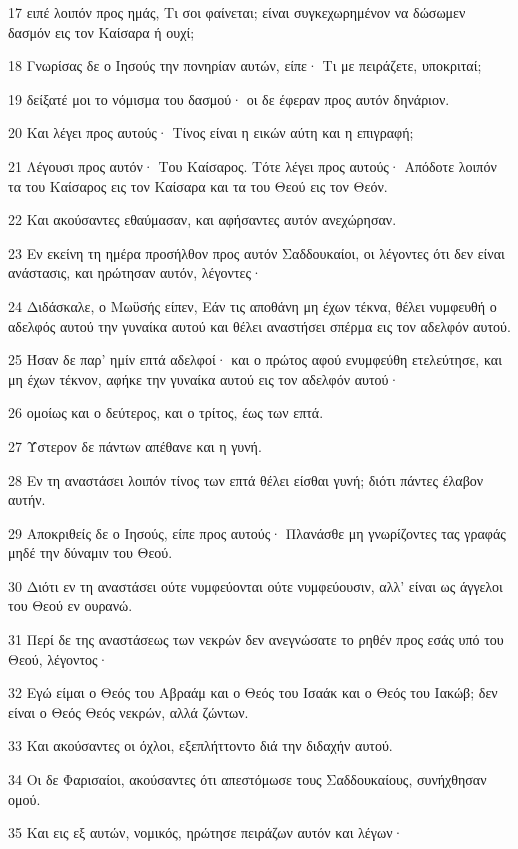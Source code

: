 \par 17 ειπέ λοιπόν προς ημάς, Τι σοι φαίνεται; είναι συγκεχωρημένον να δώσωμεν δασμόν εις τον Καίσαρα ή ουχί;
\par 18 Γνωρίσας δε ο Ιησούς την πονηρίαν αυτών, είπε· Τι με πειράζετε, υποκριταί;
\par 19 δείξατέ μοι το νόμισμα του δασμού· οι δε έφεραν προς αυτόν δηνάριον.
\par 20 Και λέγει προς αυτούς· Τίνος είναι η εικών αύτη και η επιγραφή;
\par 21 Λέγουσι προς αυτόν· Του Καίσαρος. Τότε λέγει προς αυτούς· Απόδοτε λοιπόν τα του Καίσαρος εις τον Καίσαρα και τα του Θεού εις τον Θεόν.
\par 22 Και ακούσαντες εθαύμασαν, και αφήσαντες αυτόν ανεχώρησαν.
\par 23 Εν εκείνη τη ημέρα προσήλθον προς αυτόν Σαδδουκαίοι, οι λέγοντες ότι δεν είναι ανάστασις, και ηρώτησαν αυτόν, λέγοντες·
\par 24 Διδάσκαλε, ο Μωϋσής είπεν, Εάν τις αποθάνη μη έχων τέκνα, θέλει νυμφευθή ο αδελφός αυτού την γυναίκα αυτού και θέλει αναστήσει σπέρμα εις τον αδελφόν αυτού.
\par 25 Ήσαν δε παρ' ημίν επτά αδελφοί· και ο πρώτος αφού ενυμφεύθη ετελεύτησε, και μη έχων τέκνον, αφήκε την γυναίκα αυτού εις τον αδελφόν αυτού·
\par 26 ομοίως και ο δεύτερος, και ο τρίτος, έως των επτά.
\par 27 Ύστερον δε πάντων απέθανε και η γυνή.
\par 28 Εν τη αναστάσει λοιπόν τίνος των επτά θέλει είσθαι γυνή; διότι πάντες έλαβον αυτήν.
\par 29 Αποκριθείς δε ο Ιησούς, είπε προς αυτούς· Πλανάσθε μη γνωρίζοντες τας γραφάς μηδέ την δύναμιν του Θεού.
\par 30 Διότι εν τη αναστάσει ούτε νυμφεύονται ούτε νυμφεύουσιν, αλλ' είναι ως άγγελοι του Θεού εν ουρανώ.
\par 31 Περί δε της αναστάσεως των νεκρών δεν ανεγνώσατε το ρηθέν προς εσάς υπό του Θεού, λέγοντος·
\par 32 Εγώ είμαι ο Θεός του Αβραάμ και ο Θεός του Ισαάκ και ο Θεός του Ιακώβ; δεν είναι ο Θεός Θεός νεκρών, αλλά ζώντων.
\par 33 Και ακούσαντες οι όχλοι, εξεπλήττοντο διά την διδαχήν αυτού.
\par 34 Οι δε Φαρισαίοι, ακούσαντες ότι απεστόμωσε τους Σαδδουκαίους, συνήχθησαν ομού.
\par 35 Και εις εξ αυτών, νομικός, ηρώτησε πειράζων αυτόν και λέγων·
